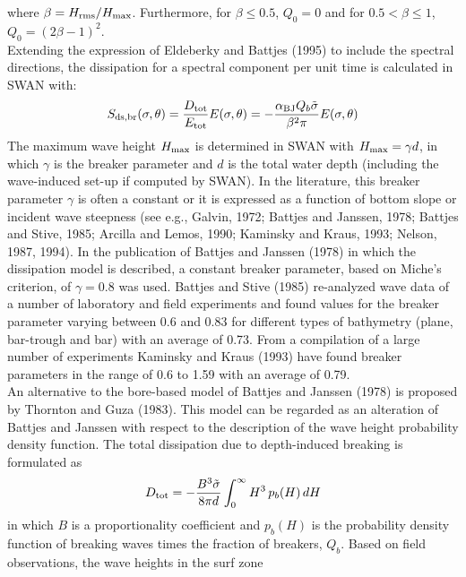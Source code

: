 \documentclass[12pt]{book}
\begin{document}
where $\beta = H_{\rm rms}/H_{\rm max}$. Furthermore, for $\beta \leq 0.5$, $Q_0 = 0$ and for
$0.5 < \beta \leq 1$, $Q_0 = (2\beta-1)^2$.
\\[2ex]
\noindent
Extending the expression of Eldeberky and Battjes (1995) to include the spectral directions, the
dissipation for a spectral component per unit time is calculated in SWAN with:
\begin{equation}
  S_{\rm ds,br} (\sigma,\theta) = \frac{D_{\rm tot}}{E_{\rm tot}} E(\sigma,\theta) =
  -\frac{\alpha_{\rm BJ} Q_b \tilde{\sigma}}{\beta^2 \pi} E(\sigma,\theta)
  \label{eq3-26}
\end{equation}
The maximum wave height $H_{\rm max}$ is determined in SWAN with $H_{\rm max} = \gamma d$, in which $\gamma$ is the breaker parameter
and $d$ is the total water depth (including the wave-induced set-up if computed by SWAN). In the literature,
this breaker parameter $\gamma$ is often a constant or it is expressed as a function of bottom slope or incident
wave steepness (see e.g., Galvin, 1972; Battjes and Janssen, 1978; Battjes and Stive, 1985; Arcilla and
Lemos, 1990; Kaminsky and Kraus, 1993; Nelson, 1987, 1994).
In the publication of Battjes and Janssen (1978) in which the dissipation model is described, a constant
breaker parameter, based on Miche's criterion, of $\gamma=0.8$ was used. Battjes and Stive (1985) re-analyzed
wave data of a number of laboratory and field experiments and found values for the breaker parameter
varying between 0.6 and 0.83 for different types of bathymetry (plane, bar-trough and bar) with an average
of 0.73. From a compilation of a large number of experiments Kaminsky and Kraus (1993) have found
breaker parameters in the range of 0.6 to 1.59 with an average of 0.79.
\nocite{Arc90L,Kam93K,Nel87,Nel94}
\\[2ex]
\noindent
An alternative to the bore-based model of Battjes and Janssen (1978) is proposed by Thornton and Guza (1983).
This model can be regarded as an alteration of Battjes and Janssen with respect to the description of the wave
height probability density function. The total dissipation due to depth-induced breaking is formulated as
\begin{equation}
  D_{\rm tot} = - \frac{B^3 \tilde{\sigma}}{8 \pi d} \int_{0}^{\infty} H^3 \, p_b(H)\,dH
  \label{eq:tg83}
\end{equation}
in which $B$ is a proportionality coefficient and $p_b(H)$ is the probability density function of breaking
waves times the fraction of breakers, $Q_b$. Based on field observations, the wave heights in the surf zone
\end{document}

